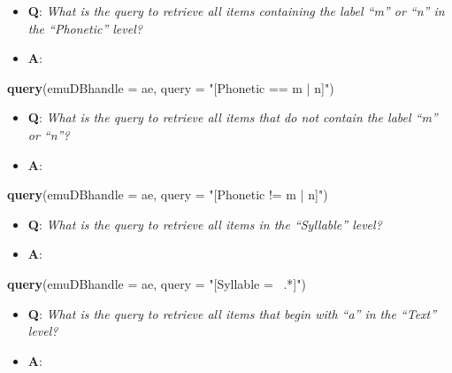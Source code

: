 \documentclass[]{book}
\newenvironment{Shaded}{\begin{snugshade}}{\end{snugshade}}
\newcommand{\DataTypeTok}[1]{\textcolor[rgb]{0.13,0.29,0.53}{#1}}
\newcommand{\KeywordTok}[1]{\textcolor[rgb]{0.13,0.29,0.53}{\textbf{#1}}}
\newcommand{\NormalTok}[1]{#1}
\newcommand{\StringTok}[1]{\textcolor[rgb]{0.31,0.60,0.02}{#1}}
\providecommand{\tightlist}{%
  \setlength{\itemsep}{0pt}\setlength{\parskip}{0pt}}
\theoremstyle{definition}
\theoremstyle{definition}
\theoremstyle{definition}
\theoremstyle{remark}
\begin{document}
\begin{itemize}
\tightlist
\item
  \textbf{Q}: \emph{What is the query to retrieve all items containing
  the label ``m'' or ``n'' in the ``Phonetic'' level?}
\item
  \textbf{A}:
\end{itemize}

\begin{Shaded}
\begin{Highlighting}[]
\KeywordTok{query}\NormalTok{(}\DataTypeTok{emuDBhandle =}\NormalTok{ ae, }
      \DataTypeTok{query =} \StringTok{"[Phonetic == m | n]"}\NormalTok{)}
\end{Highlighting}
\end{Shaded}

\begin{itemize}
\tightlist
\item
  \textbf{Q}: \emph{What is the query to retrieve all items that do not
  contain the label ``m'' or ``n''?}
\item
  \textbf{A}:
\end{itemize}

\begin{Shaded}
\begin{Highlighting}[]
\KeywordTok{query}\NormalTok{(}\DataTypeTok{emuDBhandle =}\NormalTok{ ae, }
      \DataTypeTok{query =} \StringTok{"[Phonetic != m | n]"}\NormalTok{)}
\end{Highlighting}
\end{Shaded}

\begin{itemize}
\tightlist
\item
  \textbf{Q}: \emph{What is the query to retrieve all items in the
  ``Syllable'' level?}
\item
  \textbf{A}:
\end{itemize}

\begin{Shaded}
\begin{Highlighting}[]
\KeywordTok{query}\NormalTok{(}\DataTypeTok{emuDBhandle =}\NormalTok{ ae, }
      \DataTypeTok{query =} \StringTok{"[Syllable =~ .*]"}\NormalTok{)}
\end{Highlighting}
\end{Shaded}

\begin{itemize}
\tightlist
\item
  \textbf{Q}: \emph{What is the query to retrieve all items that begin
  with ``a'' in the ``Text'' level?}
\item
  \textbf{A}:
\end{itemize}
\end{document}
